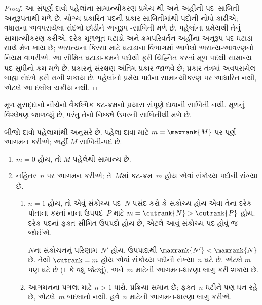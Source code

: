 \begin{proof}
આ સંપૂર્ણ દાવો પહેલાંના સામાન્યીકરણ પ્રમેય
થી અને
અહીંની પદ--સાબિતી અનુરૂપતાથી મળે છે.
યોગ્ય પ્રકારિત પદની પ્રકાર-સાબિતીમાંથી પદોની
નોંધો કાઢીએ; વધારાના અવપરાયેલા સંદર્ભો છોડીને
અનુરૂપ -સાબિતી મળે છે. પહેલાંના પ્રમેયથી
તેનું સામાન્યીકરણ કરીએ. દરેક મૂળભૂત ઘટાડો અને
ક્રમપરિવર્તન અહીંના અનુરૂપ પદ-ઘટાડા સાથે મેળ ખાય છે;
અસત્યના કિસ્સા માટે ઘટાડાના વિભાગમાં આપેલો
અસત્ય-આવરણનો નિયમ વાપરીએ. આ સીમિત ઘટાડા-ક્રમને
પદોથી ફરી ચિહ્નિત કરતાં મૂળ પદથી સામાન્ય પદ સુધીનો
ક્રમ મળે છે. પ્રકારનું સંરક્ષણ અંતિમ પ્રકાર જાળવે છે;
પ્રકાર-તંત્રમાં અવપરાયેલ બાહ્ય સંદર્ભ ફરી રાખી શકાય છે.
પહેલાંનો પ્રમેય પદોના સામાન્યીકરણ પર આધારિત નથી,
એટલે આ દલીલ ચક્રીય નથી.
\end{proof}

\begin{editorial}
મૂળ મુસદ્દાનો નીચેનો વૈકલ્પિક કટ-ક્રમનો પ્રયાસ
સંપૂર્ણ દાવાની સાબિતી નથી. મૂળનું વિશ્લેષણ
જાળવ્યું છે, પરંતુ તેનો નિષ્કર્ષ ઉપરની સાબિતીથી મળે છે.

  બીજો દાવો પહેલામાંથી અનુસરે છે. પહેલા દાવા માટે
  $m=\maxrank{M}$ પર પૂર્ણ આગમન કરીએ; અહીં $M$
  સાબિતી-પદ છે.
  \begin{enumerate}

  \item $m=0$ હોય, તો $M$ પહેલેથી સામાન્ય છે.
  \item
    નહિતર~$n$ પર આગમન કરીએ; તે~$M$માં
    કટ-ક્રમ~$m$ હોય એવાં સંકોચ્ય પદોની સંખ્યા છે.
    \begin{enumerate}
    \item $n=1$ હોય, તો એવું સંકોચ્ય પદ~$N$ પસંદ કરો
      કે સંકોચ્ય હોય એવા તેના દરેક પોતાના કરતાં
      નાના ઉપપદ~$P$ માટે $m = \cutrank{N} > \cutrank{P}$
      હોય. દરેક પદનાં ફક્ત સીમિત ઉપપદો હોય છે,
      એટલે આવું સંકોચ્ય પદ હોવું જ જોઈએ.

      $N$ના સંકોચનનું પરિણામ~$N'$ હોય.
      ઉપપાદ્યથી $\maxrank{N'} < \maxrank{N}$ છે.
      તેથી $\cutrank=m$ હોય એવાં સંકોચ્ય પદોની
      સંખ્યા~$n$ ઘટે છે. એટલે $m$ પણ ઘટે છે
      ($1$ કે વધુ જેટલું), અને~$m$ માટેની
      આગમન-ધારણા લાગુ કરી શકાય છે.
    \item આગમનના પગલા માટે $n>1$ ધારો.
      પ્રક્રિયા સમાન છે; ફક્ત~$n$ ઘટીને પણ ધન
      રહે છે, એટલે~$m$ બદલાતો નથી.
      હવે~$n$ માટેની આગમન-ધારણા લાગુ કરીએ.
    \end{enumerate}
\end{enumerate}


\end{editorial}

